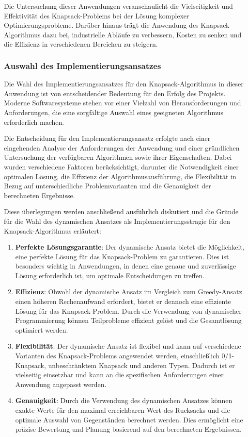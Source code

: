 Die Untersuchung dieser Anwendungen veranschaulicht die Vielseitigkeit und Effektivität des Knapsack-Problems bei der Lösung
komplexer Optimierungsprobleme. Darüber hinaus trägt die Anwendung des Knapsack-Algorithmus dazu bei, industrielle Abläufe
zu verbessern, Kosten zu senken und die Effizienz in verschiedenen Bereichen zu steigern.

\subsubsection{Auswahl des Implementierungsansatzes}
Die Wahl des Implementierungsansatzes für den Knapsack-Algorithmus in dieser Anwendung ist von entscheidender Bedeutung
für den Erfolg des Projekts. Moderne Softwaresysteme stehen vor einer Vielzahl von Herausforderungen und Anforderungen,
die eine sorgfältige Auswahl eines geeigneten Algorithmus erforderlich machen.

Die Entscheidung für den Implementierungsansatz erfolgte nach einer eingehenden Analyse der Anforderungen der Anwendung
und einer gründlichen Untersuchung der verfügbaren Algorithmen sowie ihrer Eigenschaften. Dabei wurden verschiedene
Faktoren berücksichtigt, darunter die Notwendigkeit einer optimalen Lösung, die Effizienz der Algorithmusausführung, die
Flexibilität in Bezug auf unterschiedliche Problemvarianten und die Genauigkeit der berechneten Ergebnisse.

Diese überlegungen werden anschließend ausführlich diskutiert und die Gründe für die Wahl des dynamischen Ansatzes als
Implementierungsstragie für den Knapsack-Algorithmus erläutert:
\begin{enumerate}
\item \textbf{Perfekte Lösungsgarantie}: Der dynamische Ansatz bietet die Möglichkeit, eine perfekte Lösung für das
Knapsack-Problem zu garantieren. Dies ist besonders wichtig in Anwendungen, in denen eine genaue und zuverlässige
Lösung erforderlich ist, um optimale Entscheidungen zu treffen.
\item \textbf{Effizienz}: Obwohl der dynamische Ansatz im Vergleich zum Greedy-Ansatz einen höheren Rechenaufwand
erfordert, bietet er dennoch eine effiziente Lösung für das Knapsack-Problem. Durch die Verwendung von dynamischer
Programmierung können Teilprobleme effizient gelöst und die Gesamtlösung optimiert werden.
\item \textbf{Flexibilität}: Der dynamische Ansatz ist flexibel und kann auf verschiedene Varianten des Knapsack-Problems
angewendet werden, einschließlich 0/1-Knapsack, unbeschränktem Knapsack und anderen Typen. Dadurch ist er vielseitig
einsetzbar und kann an die spezifischen Anforderungen einer Anwendung angepasst werden.
\item \textbf{Genauigkeit}: Durch die Verwendung des dynamischen Ansatzes können exakte Werte für den maximal erreichbaren
Wert des Rucksacks und die optimale Auswahl von Gegenständen berechnet werden. Dies ermöglicht eine präzise Bewertung
und Planung basierend auf den berechneten Ergebnissen.
\end{enumerate}

